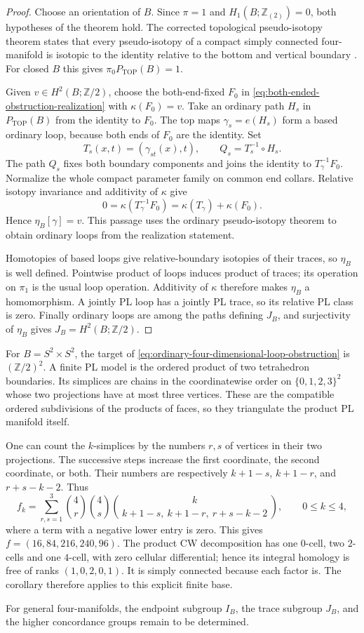 \begin{proof}
Choose an orientation of $B$. Since $\pi=1$ and
$H_1(B;\mathbb Z_{(2)})=0$, both hypotheses of the theorem hold.
The corrected topological pseudo-isotopy theorem states that
every pseudo-isotopy of a compact simply connected four-manifold
is isotopic to the identity relative to the bottom and vertical
boundary \cite[Theorem~1.5, p.~3; conventions, p.~1]
{GabaiGayHartmanKrushkalPowell2026}. For closed $B$ this gives
$\pi_0P_{\mathrm{TOP}}(B)=1$.

Given $v\in H^2(B;\mathbb Z/2)$, choose the both-end-fixed
$F_0$ in \eqref{eq:both-ended-obstruction-realization} with
$\kappa(F_0)=v$. Take an ordinary path $H_s$ in
$P_{\mathrm{TOP}}(B)$ from the identity to $F_0$. The top maps
$\gamma_s=e(H_s)$ form a based ordinary loop, because both
ends of $F_0$ are the identity. Set
\[
 T_s(x,t)=(\gamma_{st}(x),t),\qquad Q_s=T_s^{-1}\circ H_s.
\]
The path $Q_s$ fixes both boundary components and joins the
identity to $T_\gamma^{-1}F_0$. Normalize the whole compact
parameter family on common end collars. Relative isotopy
invariance and additivity of $\kappa$ give
\[
            0=\kappa(T_\gamma^{-1}F_0)
                  =\kappa(T_\gamma)+\kappa(F_0).
\]
Hence $\eta_B[\gamma]=v$. This passage uses the ordinary
pseudo-isotopy theorem to obtain ordinary loops from the
realization statement.

Homotopies of based loops give relative-boundary isotopies of
their traces, so $\eta_B$ is well defined. Pointwise product of
loops induces product of traces; its operation on $\pi_1$ is
the usual loop operation. Additivity of $\kappa$ therefore
makes $\eta_B$ a homomorphism. A jointly PL loop has a jointly
PL trace, so its relative PL class is zero. Finally ordinary
loops are among the paths defining $J_B$, and surjectivity of
$\eta_B$ gives $J_B=H^2(B;\mathbb Z/2)$.
\end{proof}

\begin{example}\label{ex:four-dimensional-product-sphere-trace}
For $B=S^2\times S^2$, the target of
\eqref{eq:ordinary-four-dimensional-loop-obstruction} is
$(\mathbb Z/2)^2$. A finite PL model is the ordered product of
two tetrahedron boundaries. Its simplices are chains in the
coordinatewise order on $\{0,1,2,3\}^2$ whose two projections
have at most three vertices. These are the compatible ordered
subdivisions of the products of faces, so they triangulate the
product PL manifold itself.

One can count the $k$-simplices by the numbers $r,s$ of vertices
in their two projections. The successive steps increase the
first coordinate, the second coordinate, or both. Their numbers
are respectively $k+1-s$, $k+1-r$, and $r+s-k-2$. Thus
\[
 f_k=\sum_{r,s=1}^{3}\binom4r\binom4s
       \binom{k}{\,k+1-s,\ k+1-r,\ r+s-k-2\,},
 \qquad 0\leq k\leq4,
\]
where a term with a negative lower entry is zero. This gives
$f=(16,84,216,240,96)$. The product CW decomposition has one
$0$-cell, two $2$-cells and one $4$-cell, with zero cellular
differential; hence its integral homology is free of ranks
$(1,0,2,0,1)$. It is simply connected because each factor is.
The corollary therefore applies to this explicit finite base.
\end{example}

For general four-manifolds, the endpoint subgroup $I_B$, the trace
subgroup $J_B$, and the higher concordance groups remain to be determined.
